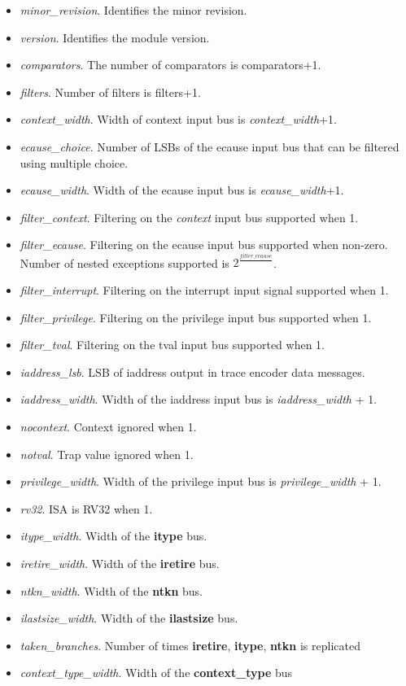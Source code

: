 \begin{itemize}
    \item \textit {minor\_revision}. Identifies the minor revision.
    \item \textit {version}. Identifies the module version.
    \item \textit {comparators}. The number of comparators is comparators+1.
    \item \textit {filters}. Number of filters is filters+1.
    \item \textit {context\_width}. Width of context input bus is \textit {context\_width}+1.
    \item \textit {ecause\_choice}. Number of LSBs of the ecause input bus that can be filtered using multiple choice.
    \item \textit {ecause\_width}. Width of the ecause input bus is \textit {ecause\_width}+1.
    \item \textit {filter\_context}. Filtering on the \textit {context} input bus supported when 1.
    \item \textit {filter\_ecause}. Filtering on the ecause input bus supported when non-zero.  Number of nested exceptions supported is $2^\frac{\textit {filter\_ecause}}{}$.
    \item \textit {filter\_interrupt}. Filtering on the interrupt input signal supported when 1.
    \item \textit {filter\_privilege}. Filtering on the privilege input bus supported when 1.
    \item \textit {filter\_tval}. Filtering on the tval input bus supported when 1.
    \item \textit {iaddress\_lsb}. LSB of iaddress output in trace encoder data messages.
    \item \textit {iaddress\_width}. Width of the iaddress input bus is \textit {iaddress\_width} + 1.
    \item \textit {nocontext}. Context ignored when 1.
    \item \textit {notval}. Trap value ignored when 1.
    \item \textit {privilege\_width}. Width of the privilege input bus is \textit {privilege\_width} + 1.
    \item \textit {rv32}. ISA is RV32 when 1.
    \item \textit {itype\_width}. Width of the \textbf{itype} bus.
    \item \textit {iretire\_width}. Width of the \textbf{iretire} bus.
    \item \textit {ntkn\_width}. Width of the \textbf{ntkn} bus.
    \item \textit {ilastsize\_width}. Width of the \textbf{ilastsize} bus.
    \item \textit {taken\_branches}. Number of times \textbf{iretire}, \textbf{itype}, \textbf{ntkn} is replicated
    \item \textit {context\_type\_width}. Width of the \textbf{context\_type} bus
\end{itemize}
